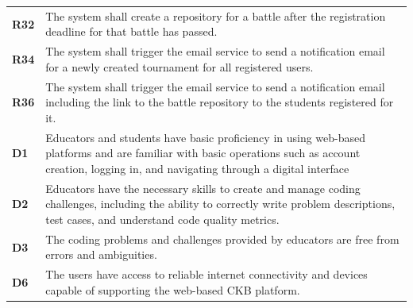 \begin{table}[h!]
\begin{tabular}{lp{15cm}}
    \textbf{R32} & The system shall create a repository for a battle after the registration deadline for that battle has passed. \\

    \textbf{R34} & The system shall trigger the email service to send a notification email for a newly created tournament for all registered users. \\

        \textbf{R36} & The system shall trigger the email service to send a notification email including the link to
the battle repository to the students registered for it. \\

    \hline
    \hline
    \textbf{D1} & Educators and students have basic proficiency in using web-based platforms and are familiar with basic operations such as account creation, logging in, and navigating through a digital interface \\
    \textbf{D2} & Educators have the necessary skills to create and manage coding challenges, including the ability to correctly write problem descriptions, test cases, and understand code quality metrics. \\

    \textbf{D3} & The coding problems and challenges provided by educators are free from errors and ambiguities. \\

    \textbf{D6} & The users have access to reliable internet connectivity and devices capable of supporting the web-based CKB platform. \\
    \hline
  \end{tabular}
\end{table}


\newpage

